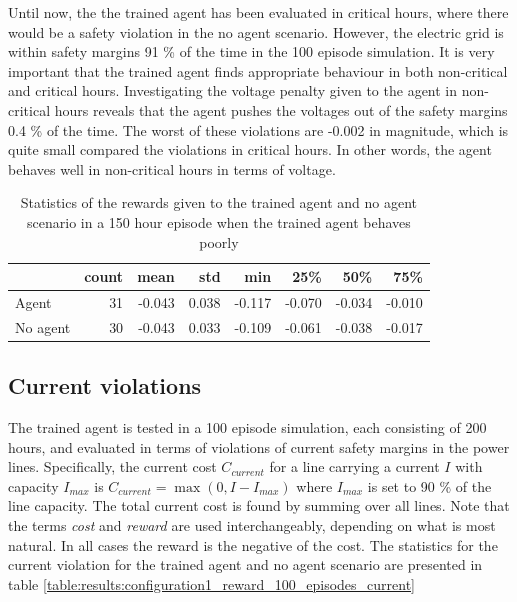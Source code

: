 \documentclass[class=book, crop=false]{standalone}
\begin{document}
Until now, the the trained agent has been evaluated in critical hours, where there would be a safety violation in the no agent scenario. However, the electric grid is within safety margins 91 \% of the time in the 100 episode simulation. It is very important that the trained agent finds appropriate behaviour in both non-critical and critical hours. Investigating the voltage penalty given to the agent in non-critical hours reveals that the agent pushes the voltages out of the safety margins 0.4 \% of the time. The worst of these violations are -0.002 in magnitude, which is quite small compared the violations in critical hours. In other words, the agent behaves well in non-critical hours in terms of voltage. 
\begin{table}[h]
\center
\begin{tabular}{l|rrrrrrr}
         & count  & mean   & std   & min    & 25\%   & 50\%   & 75\%   \\
\hline
Agent    & 31    & -0.043 & 0.038 & -0.117 & -0.070 & -0.034 & -0.010 \\
No agent & 30    & -0.043 & 0.033 & -0.109 & -0.061 & -0.038 & -0.017 \\
\hline
\end{tabular}
\caption{Statistics of the rewards given to the trained agent and no agent scenario in a 150 hour episode when the trained agent behaves poorly}
\label{table:results:config1_150hour_bad_voltage}
\end{table}




\subsection{Current violations}\label{section:config1:current_violations}
The trained agent is tested in a 100 episode simulation, each consisting of 200 hours, and evaluated in terms of violations of current safety margins in the power lines. Specifically, the current cost $C_{current}$ for a line carrying a current $I$ with capacity $I_{max}$ is $C_{current} = \max(0,I - I_{max})$ where $I_{max}$ is set to 90 \% of the line capacity. The total current cost is found by summing over all lines. Note that the terms \textit{cost} and \textit{reward} are used interchangeably, depending on what is most natural. In all cases the reward is the negative of the cost. The statistics for the current violation for the trained agent and no agent scenario are presented in table \ref{table:results:configuration1_reward_100_episodes_current}
\end{document}
